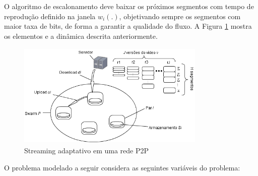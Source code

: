 \documentclass[
	12pt,				%
	oneside,			%
	a4paper,			%
	english,			%
	brazil				%
	]{abntex2ppgsi}
\begin{document}
O algoritmo de escalonamento deve baixar os próximos segmentos com tempo de reprodução definido na janela $w_i(.)$, objetivando sempre os segmentos com maior taxa de bits, de forma a garantir a qualidade do fluxo.  A Figura \ref{fig:StreamingAdaptativo} mostra os elementos e a dinâmica descrita anteriormente.

\begin{figure}[H]%
	\centering
	\includegraphics[height=5cm,width=0.8\textwidth]{figuras/Streaming_swarm.png}
 	 \caption{Streaming adaptativo em uma rede P2P}
	\label{fig:StreamingAdaptativo}
\end{figure}

 O problema modelado a seguir considera as seguintes variáveis do problema:
\end{document}

